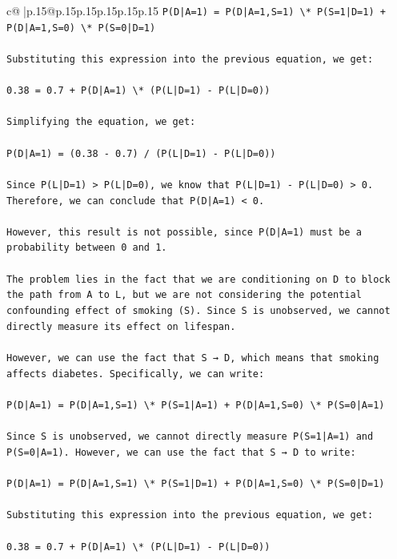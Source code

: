 \documentclass{article}
\begin{document}
{\begin{supertabular}{c@{$\;$}|p{.15\linewidth}@{}p{.15\linewidth}p{.15\linewidth}p{.15\linewidth}p{.15\linewidth}p{.15\linewidth}}
{{{\texttt{P(D|A=1) = P(D|A=1,S=1) \textbackslash{}* P(S=1|D=1) + P(D|A=1,S=0) \textbackslash{}* P(S=0|D=1)} \\
\\ 
\texttt{Substituting this expression into the previous equation, we get:} \\
\\ 
\texttt{0.38 = 0.7 + P(D|A=1) \textbackslash{}* (P(L|D=1) {-} P(L|D=0))} \\
\\ 
\texttt{Simplifying the equation, we get:} \\
\\ 
\texttt{P(D|A=1) = (0.38 {-} 0.7) / (P(L|D=1) {-} P(L|D=0))} \\
\\ 
\texttt{Since P(L|D=1) > P(L|D=0), we know that P(L|D=1) {-} P(L|D=0) > 0. Therefore, we can conclude that P(D|A=1) < 0.} \\
\\ 
\texttt{However, this result is not possible, since P(D|A=1) must be a probability between 0 and 1.} \\
\\ 
\texttt{The problem lies in the fact that we are conditioning on D to block the path from A to L, but we are not considering the potential confounding effect of smoking (S). Since S is unobserved, we cannot directly measure its effect on lifespan.} \\
\\ 
\texttt{However, we can use the fact that S → D, which means that smoking affects diabetes. Specifically, we can write:} \\
\\ 
\texttt{P(D|A=1) = P(D|A=1,S=1) \textbackslash{}* P(S=1|A=1) + P(D|A=1,S=0) \textbackslash{}* P(S=0|A=1)} \\
\\ 
\texttt{Since S is unobserved, we cannot directly measure P(S=1|A=1) and P(S=0|A=1). However, we can use the fact that S → D to write:} \\
\\ 
\texttt{P(D|A=1) = P(D|A=1,S=1) \textbackslash{}* P(S=1|D=1) + P(D|A=1,S=0) \textbackslash{}* P(S=0|D=1)} \\
\\ 
\texttt{Substituting this expression into the previous equation, we get:} \\
\\ 
\texttt{0.38 = 0.7 + P(D|A=1) \textbackslash{}* (P(L|D=1) {-} P(L|D=0))} \\
}}}
\end{supertabular}}
\end{document}
